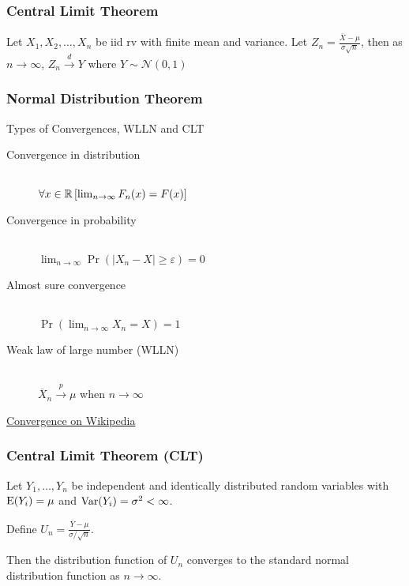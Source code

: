 \subsubsection{Central Limit Theorem}
Let $X_1, X_2, \ldots, X_n$ be iid rv with finite mean and variance.
Let $Z_n=\frac{\overline{X}-\mu}{\sigma\sqrt{n}}$,
then as $n \to \infty$, $Z_n\xrightarrow{d} Y$ where $Y \sim \mathcal{N}(0,1)$

\subsubsection{Normal Distribution Theorem}


\color{gray}




Types of Convergences, WLLN and CLT

\begin{description}
\item[Convergence in distribution]\hfill\\
	$\forall x\in {\mathbb R} \left[\lim_{n\to\infty}F_n(x)=F(x)\right]$
\item[Convergence in probability]\hfill\\
	$\lim_{n\to\infty}\Pr(|X_n-X|\geq\varepsilon)=0$
\item[Almost sure convergence]\hfill\\
	$\Pr(\lim_{n\to\infty}X_n = X)=1$
\item[Weak law of large number (WLLN)]\hfill\\
	$\overline{X}_n\xrightarrow{p} \mu$ when $n\to \infty$
\end{description}


\href{https://en.wikipedia.org/wiki/Convergence_of_random_variables}{Convergence on Wikipedia}

\subsubsection{Central Limit Theorem (CLT)}

Let $Y_1, \ldots, Y_n$ be independent and identically distributed random variables with $\mathrm{E}(Y_i)=\mu$ and $\mathrm{Var}(Y_i)=\sigma^2<\infty$.

Define $U_n = \frac{\overline{Y}-\mu}{\sigma/\sqrt{n}}$.

Then the distribution function of $U_n$ converges to the standard normal distribution function as $n\to \infty$.



\color{black}